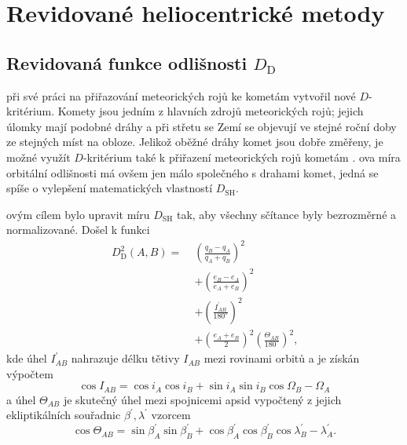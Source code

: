 \chapter{Revidované heliocentrické metody}%

\section{Revidovaná funkce odlišnosti $D_\text{D}$}%
\citeauthor{cometassoc} při své práci na přiřazování meteorických rojů ke kometám \cite{cometassoc} vytvořil nové $D$-kritérium. Komety jsou jedním z hlavních zdrojů meteorických rojů; jejich úlomky mají podobné dráhy a při střetu se Zemí se objevují ve stejné roční doby ze stejných míst na obloze. Jelikož oběžné dráhy komet jsou dobře změřeny, je možné využít $D$-kritérium také k přiřazení meteorických rojů kometám \cite{cometassoc}. \citeauthor{cometassoc}ova míra orbitální odlišnosti má ovšem jen málo společného s drahami komet, jedná se spíše o vylepšení matematických vlastností $D_\text{SH}$.

\citeauthor{cometassoc}ovým cílem bylo upravit míru $D_\text{SH}$ tak, aby všechny sčítance byly bezrozměrné a normalizované. Došel k funkci \cite{cometassoc}\cite{remarks}
\begin{equation}
    \begin{aligned}
        D_\text{D}^2(A,B)=\; & \left( \frac{q_B-q_A}{q_A+q_B} \right)^2                                                   \\
                             & +\left( \frac{e_B-e_A}{e_A+e_B} \right)^2                                                  \\
                             & +\left( \frac{I^\prime_{AB}}{180^\circ} \right)^2                                          \\
                             & +\left( \frac{e_A+e_B}{2} \right)^2\left( \frac{\Theta_{AB}}{180^\circ} \right)^2 \text{,}
    \end{aligned}
    \label{eqn:revised:d_d}
\end{equation}
kde úhel $I^\prime_{AB}$ nahrazuje délku tětivy $I_{AB}$ mezi rovinami orbitů a je získán výpočtem \cite{cometassoc}
\begin{equation}
    \cos{I_{AB}}=\cos{i_A}\cos{i_B}+\sin{i_A}\sin{i_B}\cos{\Omega_B-\Omega_A}
\end{equation}
a úhel $\Theta_{AB}$ je skutečný úhel mezi spojnicemi apsid vypočtený z jejich ekliptikálních souřadnic $\beta^\prime,\lambda^\prime$ vzorcem \cite{cometassoc}
\begin{equation}
    \cos{\Theta_{AB}}=\sin{\beta^\prime_A}\sin{\beta^\prime_B}+\cos{\beta^\prime_A}\cos{\beta^\prime_B}\cos{\lambda^\prime_B-\lambda^\prime_A} \text{.}
\end{equation}


